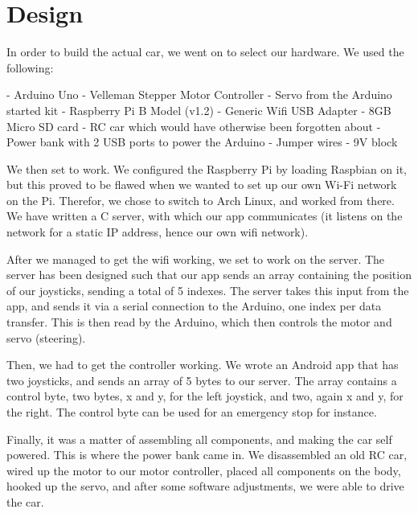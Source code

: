 \section{Design}
\par
In order to build the actual car, we went on to select our hardware. We used the following:

 - Arduino Uno
 - Velleman Stepper Motor Controller
 - Servo from the Arduino started kit
 - Raspberry Pi B Model (v1.2)
 - Generic Wifi USB Adapter
 - 8GB Micro SD card
 - RC car which would have otherwise been forgotten about
 - Power bank with 2 USB ports to power the Arduino
 - Jumper wires
 - 9V block

We then set to work. We configured the Raspberry Pi by loading Raspbian on it, but this proved to be flawed when we wanted to set up our own Wi-Fi network on the Pi. Therefor, we chose to switch to Arch Linux, and worked from there. We have written a C server, with which our app communicates (it listens on the network for a static IP address, hence our own wifi network).

After we managed to get the wifi working, we set to work on the server. The server has been designed such that our app sends an array containing the position of our joysticks, sending a total of 5 indexes. The server takes this input from the app, and sends it via a serial connection to the Arduino, one index per data transfer. This is then read by the Arduino, which then controls the motor and servo (steering). 

Then, we had to get the controller working. We wrote an Android app that has two joysticks, and sends an array of 5 bytes to our server. The array contains a control byte, two bytes, x and y, for the left joystick, and two, again x and y, for the right. The control byte can be used for an emergency stop for instance.

Finally, it was a matter of assembling all components, and making the car self powered. This is where the power bank came in. We disassembled an old RC car, wired up the motor to our motor controller, placed all components on the body, hooked up the servo, and after some software adjustments, we were able to drive the car.
